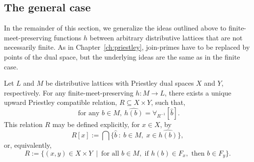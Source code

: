 \subsection*{The general case}
In the remainder of this section, we generalize the ideas outlined above to finite-meet-preserving functions $h$ between arbitrary distributive lattices that are not necessarily finite. As in Chapter~\ref{ch:priestley}, join-primes have to be replaced by points of the dual space, but the underlying ideas are the same as in the finite case.  


\begin{proposition}\label{prop:relation-dual-to-box}
	Let $L$ and $M$ be distributive lattices with Priestley dual spaces $X$ and $Y$, respectively. For any finite-meet-preserving $h \colon M \to L$, there exists a unique upward Priestley compatible relation, $R \subseteq X \times Y$, such that, 
	\begin{equation}\label{eq:h-is-box-of-relation}
		\text{ for any } b \in M, \ \widehat{h(b)} = \forall_{R^{-1}}[\widehat{b}].
	\end{equation}
	This relation $R$ may be defined explicitly, for $x \in X$, by
	\begin{equation}\label{eq:relation-image-of-point} 
		R[x] := \bigcap \{ \widehat{b} \ \colon \ b \in M, \; x \in \widehat{h(b)} \},
	\end{equation}
	or, equivalently,
	\begin{equation}\label{eq:relation-dual-to-box-def}
		R := \{(x,y) \in X \times Y \ \mid \ \text{for all } b \in M, \text{ if } h(b) \in F_x, \text{ then } b \in F_y \}.
	\end{equation}
\end{proposition}

